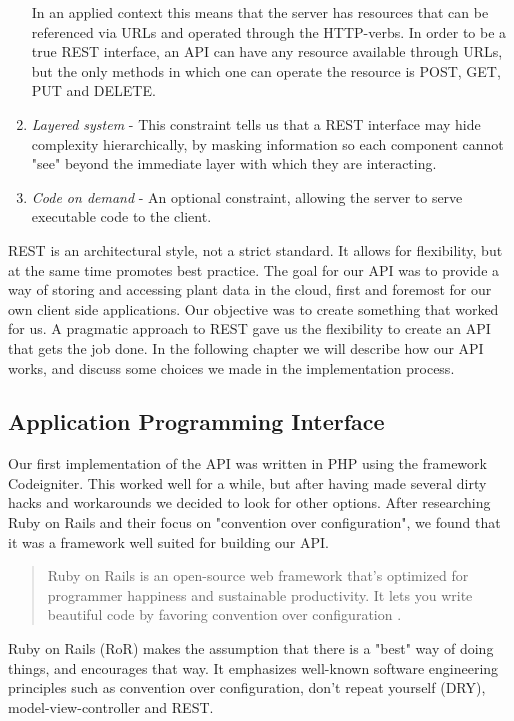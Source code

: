 \begin{enumerate}
In an applied context this means that the server has resources that can be referenced via URLs and operated through the HTTP-verbs. In order to be a true REST interface, an API can have any resource available through URLs, but the only methods in which one can operate the resource is POST, GET, PUT and DELETE.

\item{} \emph{Layered system} - This constraint tells us that a REST interface may hide complexity hierarchically, by masking information so each component cannot "see" beyond the immediate layer with which they are interacting. \citep{fielding2000architectural}

\item{} \emph{Code on demand} - An optional constraint, allowing the server to serve executable code to the client. 

\end{enumerate}

REST is an architectural style, not a strict standard. It allows for flexibility, but at the same time promotes best practice. The goal for our API was to provide a way of storing and accessing plant data in the cloud, first and foremost for our own client side applications. Our objective was to create something that worked for us. A pragmatic approach to REST gave us the flexibility to create an API that gets the job done. In the following chapter we will describe how our API works, and discuss some choices we made in the implementation process.

\subsection{Application Programming Interface}
Our first implementation of the API was written in PHP using the framework Codeigniter. This worked well for a while, but after having made several dirty hacks and workarounds we decided to look for other options. After researching Ruby on Rails and their focus on "convention over configuration", we found that it was a framework well suited for building our API.  

\begin{quote}
Ruby on Rails is an open-source web framework that's optimized for programmer happiness and sustainable productivity. It lets you write beautiful code by favoring convention over configuration \citep{rubyonrails.org}. 
\end{quote}

Ruby on Rails (RoR) makes the assumption that there is a "best" way of doing things, and encourages that way. It emphasizes well-known software engineering principles such as convention over configuration, don't repeat yourself (DRY), model-view-controller and REST.

